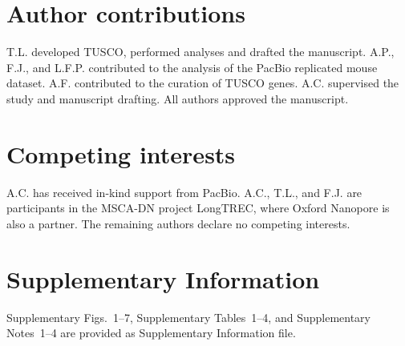 \documentclass[pdflatex,sn-nature]{sn-jnl}%
\begin{document}
\section{Author contributions}

T.L. developed TUSCO, performed analyses and drafted the manuscript. A.P., F.J., and L.F.P. contributed to the analysis of the PacBio replicated mouse dataset. A.F. contributed to the curation of TUSCO genes. A.C. supervised the study and manuscript drafting. All authors approved the manuscript.

\section{Competing interests}

A.C. has received in-kind support from PacBio. A.C., T.L., and F.J. are participants in the MSCA-DN project LongTREC, where Oxford Nanopore is also a partner. The remaining authors declare no competing interests.




\clearpage
\processdelayedfloats


\newpage
\section*{Supplementary Information}

Supplementary Figs.~1--7, Supplementary Tables~1--4, and Supplementary Notes~1--4 are provided as Supplementary Information file.
\end{document}
